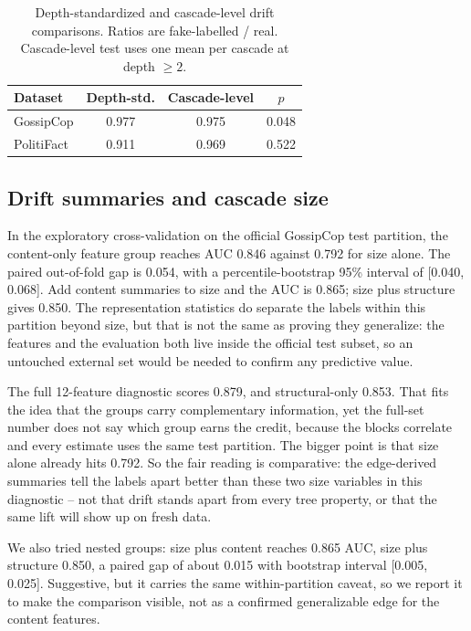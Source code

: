 \documentclass[conference]{IEEEtran}
\begin{document}
\begin{table}[t]
\caption{Depth-standardized and cascade-level drift comparisons. Ratios are
fake-labelled / real. Cascade-level test uses one mean per cascade at depth
$\geq2$.}
\label{tab:drift}
\centering
\footnotesize
\setlength{\tabcolsep}{2pt}
\begin{tabular}{lccc}
\toprule
Dataset & Depth-std. & Cascade-level & $p$ \\
\midrule
GossipCop & 0.977 & 0.975 & 0.048 \\
PolitiFact & 0.911 & 0.969 & 0.522 \\
\bottomrule
\end{tabular}
\end{table}

\subsection{Drift summaries and cascade size}
In the exploratory cross-validation on the official GossipCop test partition,
the content-only feature group reaches AUC 0.846 against 0.792 for size alone.
The paired out-of-fold gap is 0.054, with a percentile-bootstrap 95\% interval
of [0.040, 0.068]. Add content summaries to size and the AUC is 0.865; size
plus structure gives 0.850. The representation statistics do separate the
labels within this partition beyond size, but that is not the same as proving
they generalize: the features and the evaluation both live inside the official
test subset, so an untouched external set would be needed to confirm any
predictive value.

The full 12-feature diagnostic scores 0.879, and structural-only 0.853. That
fits the idea that the groups carry complementary information, yet the full-set
number does not say which group earns the credit, because the blocks correlate
and every estimate uses the same test partition. The bigger point is that size
alone already hits 0.792. So the fair reading is comparative: the edge-derived
summaries tell the labels apart better than these two size variables in this
diagnostic -- not that drift stands apart from every tree property, or that the
same lift will show up on fresh data.

We also tried nested groups: size plus content reaches 0.865 AUC, size plus
structure 0.850, a paired gap of about 0.015 with bootstrap interval
[0.005, 0.025]. Suggestive, but it carries the same within-partition caveat, so
we report it to make the comparison visible, not as a confirmed generalizable
edge for the content features.
\end{document}
